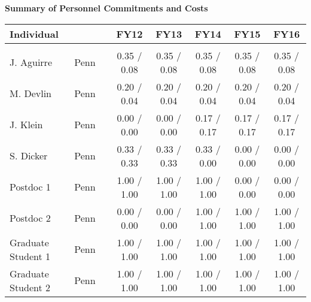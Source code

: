 

\centerline{\bf Summary of Personnel Commitments and Costs}
\vspace{1in}



\begin{table}[tbh]
\begin{center}
\protect\small 
\vspace{1ex}
\begin{tabular}{lccccccc}
\hline \hline
Individual	&   &  & FY12 & FY13 & FY14 & FY15 & FY16  \\
\hline \\[-0.5ex]

J. Aguirre	   & Penn    &	&  0.35 / 0.08 &  0.35 / 0.08 &  0.35 / 0.08 &  0.35 / 0.08 &  0.35 / 0.08  \\
M. Devlin	   & Penn    &	&  0.20 / 0.04 &  0.20 / 0.04 &  0.20 / 0.04 &  0.20 / 0.04 &  0.20 / 0.04  \\
J. Klein	   & Penn    &	&  0.00 / 0.00 &  0.00 / 0.00 &  0.17 / 0.17 &  0.17 / 0.17 &  0.17 / 0.17  \\
S. Dicker	   & Penn    &  &  0.33 / 0.33 &  0.33 / 0.33 &  0.33 / 0.00 &  0.00 / 0.00 &  0.00 / 0.00  \\
Postdoc 1	   & Penn    &	&  1.00 / 1.00 &  1.00 / 1.00 &  1.00 / 1.00 &  0.00 / 0.00 &  0.00 / 0.00  \\
Postdoc	2	   & Penn    &	&  0.00 / 0.00 &  0.00 / 0.00 &  1.00 / 1.00 &  1.00 / 1.00 &  1.00 / 1.00  \\
Graduate Student 1  & Penn    &	&  1.00 / 1.00 &  1.00 / 1.00 &  1.00 / 1.00 &  1.00 / 1.00 &  1.00 / 1.00  \\
Graduate Student 2  & Penn    &	&  1.00 / 1.00 &  1.00 / 1.00 &  1.00 / 1.00 &  1.00 / 1.00 &  1.00 / 1.00  \\



% 
% 


\end{tabular}
\end{center}
\end{table}
